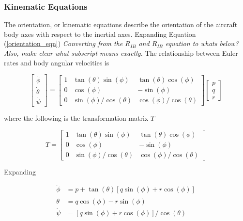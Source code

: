 \subsubsection{Kinematic Equations}

The orientation, or kinematic equations describe the orientation of the aircraft body axes with respect to the inertial axes.
Expanding Equation (\ref{orientation_eqn})
\textit{Converting from the $\dot{R}_{IB}$ and $R_{IB}$ equation to whats below? Also, make clear what subscript means exactly.}
The relationship between Euler rates and body angular velocities is

\begin{equation*}
  \label{eulr_ss_eqn_1}
  \left[
    \begin{array}{c}
    \dot{\phi} \\
    \dot{\theta} \\
    \dot{\psi}
    \end{array}
  \right]
  =
  \left[
    \begin{array}{ccc}
      1 & \tan(\theta)\sin(\phi) & \tan(\theta)\cos(\phi) \\
      0 & \cos(\phi) & -\sin(\phi) \\
      0 & \sin(\phi)/\cos(\theta) & \cos(\phi)/\cos(\theta)
    \end{array}
  \right]
  \left[
    \begin{array}{c}
      p \\
      q \\
      r
    \end{array}
  \right]
\end{equation*}

where the following is the transformation matrix $T$

\begin{equation*}
  \label{eulr_ss_eqn_2}
  T=
  \left[
    \begin{array}{ccc}
      1 & \tan(\theta)\sin(\phi) & \tan(\theta)\cos(\phi) \\
      0 & \cos(\phi) & -\sin(\phi) \\
      0 & \sin(\phi)/\cos(\theta) & \cos(\phi)/\cos(\theta)
    \end{array}
  \right]
\end{equation*}

Expanding

\begin{equation}
  \label{ssorientation_eqn}
  \begin{split}
    \dot{\phi}&=p+\tan(\theta)[q\sin(\phi)+r\cos(\phi)] \\
    \dot{\theta}&=q\cos(\phi)-r\sin(\phi) \\
    \dot{\psi}&=[q\sin(\phi)+r\cos(\phi)]/\cos(\theta) \\
  \end{split}
\end{equation}

